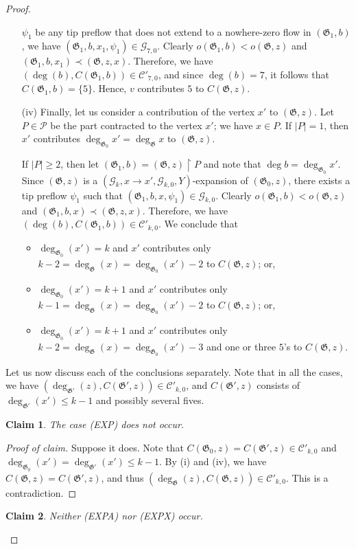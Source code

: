 \documentclass{article}
\newcommand{\PP}{\mathcal{P}}
\newcommand{\GG}{\mathcal{G}}
\newcommand{\CC}{\mathcal{C}}
\newcommand\g{\mathfrak{G}}
\newtheorem*{claim*}{Claim}
\newenvironment{subproof}{%
  \renewcommand{\qedsymbol}{$\blacksquare$}%
  \begin{proof}[Proof of claim]%
}{%
  \end{proof}%
}
\begin{document}
\begin{proof}
\begin{itemize}
$\psi_1$ be any tip preflow that does not extend to a nowhere-zero flow in $(\g_1,b)$, we have
$(\g_1,b,x_1,\psi_1)\in\GG_{7,0}$. Clearly $o(\g_1,b)<o(\g,z)$ and $(\g_1,b,x_1)\prec (\g,z,x)$.
Therefore, we have $(\deg(b),C(\g_1,b))\in \CC'_{7,0}$, and since $\deg(b)=7$, it follows that $C(\g_1,b)=\{5\}$.
Hence, $v$ contributes $5$ to $C(\g,z)$.
\item[(iv)] Finally, let us consider a contribution of the vertex $x'$ to $(\g,z)$.  Let $P\in\PP$ be the part contracted to the vertex $x'$;
we have $x\in P$.  If $|P|=1$, then $x'$ contributes $\deg_{\g_0} x'=\deg_{\g} x$ to $(\g,z)$.

If $|P|\ge 2$, then let $(\g_1,b)=(\g,z) \restriction P$ and note that $\deg b=\deg_{\g_0} x'$.
Since $(\g,z)$ is a $(\GG_k,x\to x',\GG_{k,0},Y)$-expansion of $(\g_0,z)$, there exists a tip preflow $\psi_1$
such that $(\g_1,b,x,\psi_1)\in\GG_{k,0}$.  Clearly $o(\g_1,b)<o(\g,z)$ and $(\g_1,b,x)\prec (\g,z,x)$.
Therefore, we have $(\deg(b),C(\g_1,b))\in \CC'_{k,0}$.  We conclude that
\begin{itemize}
\item $\deg_{\g_0}(x')=k$ and $x'$ contributes only $k-2=\deg_{\g}(x)=\deg_{\g_0}(x')-2$ to $C(\g,z)$; or,
\item $\deg_{\g_0}(x')=k+1$ and $x'$ contributes only $k-1=\deg_{\g}(x)=\deg_{\g_0}(x')-2$ to $C(\g,z)$; or,
\item $\deg_{\g_0}(x')=k+1$ and $x'$ contributes only $k-2=\deg_{\g}(x)=\deg_{\g_0}(x')-3$ and one or three $5$'s to $C(\g,z)$.
\end{itemize}
\end{itemize}

Let us now discuss each of the conclusions separately.  Note that in all the cases, we have $(\deg_{\g'}(z),C(\g',z))\in \CC'_{k,0}$,
and $C(\g',z)$ consists of $\deg_{\g'}(x')\le k-1$ and possibly several fives.
\begin{claim*}
The case (EXP) does not occur.
\end{claim*}

\begin{subproof}
Suppose it does. Note that $C(\g_0,z)=C(\g',z)\in \CC'_{k,0}$ and $\deg_{\g_0}(x')=\deg_{\g'}(x')\le k-1$. By (i) and (iv), we have $C(\g,z)=C(\g',z)$, and thus $(\deg_{\g}(z), C(\g,z))\in \CC'_{k,0}$.
This is a contradiction.
\end{subproof}

\begin{claim*}
Neither (EXPA) nor (EXPX) occur.
\end{claim*}


\end{proof}
\end{document}
